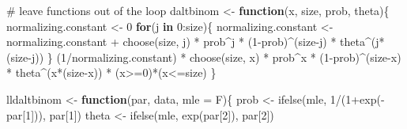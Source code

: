 \documentclass[
]{article}
\newenvironment{Shaded}{\begin{snugshade}}{\end{snugshade}}
\newcommand{\AttributeTok}[1]{\textcolor[rgb]{0.40,0.45,0.13}{#1}}
\newcommand{\CommentTok}[1]{\textcolor[rgb]{0.37,0.37,0.37}{#1}}
\newcommand{\ControlFlowTok}[1]{\textcolor[rgb]{0.00,0.23,0.31}{\textbf{#1}}}
\newcommand{\DecValTok}[1]{\textcolor[rgb]{0.68,0.00,0.00}{#1}}
\newcommand{\FunctionTok}[1]{\textcolor[rgb]{0.28,0.35,0.67}{#1}}
\newcommand{\NormalTok}[1]{\textcolor[rgb]{0.00,0.23,0.31}{#1}}
\newcommand{\OtherTok}[1]{\textcolor[rgb]{0.00,0.23,0.31}{#1}}
\newcommand{\SpecialCharTok}[1]{\textcolor[rgb]{0.37,0.37,0.37}{#1}}
\begin{document}
\begin{Shaded}
\begin{Highlighting}[numbers=left,,]
\CommentTok{\# leave functions out of the loop}
\NormalTok{daltbinom }\OtherTok{\textless{}{-}} \ControlFlowTok{function}\NormalTok{(x, size, prob, theta)\{}
\NormalTok{  normalizing.constant }\OtherTok{\textless{}{-}} \DecValTok{0}
  \ControlFlowTok{for}\NormalTok{(j }\ControlFlowTok{in} \DecValTok{0}\SpecialCharTok{:}\NormalTok{size)\{}
\NormalTok{    normalizing.constant }\OtherTok{\textless{}{-}}\NormalTok{ normalizing.constant }\SpecialCharTok{+} 
      \FunctionTok{choose}\NormalTok{(size, j) }\SpecialCharTok{*}\NormalTok{ prob}\SpecialCharTok{\^{}}\NormalTok{j }\SpecialCharTok{*}\NormalTok{ (}\DecValTok{1}\SpecialCharTok{{-}}\NormalTok{prob)}\SpecialCharTok{\^{}}\NormalTok{(size}\SpecialCharTok{{-}}\NormalTok{j) }\SpecialCharTok{*}\NormalTok{ theta}\SpecialCharTok{\^{}}\NormalTok{(j}\SpecialCharTok{*}\NormalTok{(size}\SpecialCharTok{{-}}\NormalTok{j))}
\NormalTok{  \}}
\NormalTok{  (}\DecValTok{1}\SpecialCharTok{/}\NormalTok{normalizing.constant) }\SpecialCharTok{*}
    \FunctionTok{choose}\NormalTok{(size, x) }\SpecialCharTok{*}\NormalTok{ prob}\SpecialCharTok{\^{}}\NormalTok{x }\SpecialCharTok{*}\NormalTok{ (}\DecValTok{1}\SpecialCharTok{{-}}\NormalTok{prob)}\SpecialCharTok{\^{}}\NormalTok{(size}\SpecialCharTok{{-}}\NormalTok{x) }\SpecialCharTok{*}\NormalTok{ theta}\SpecialCharTok{\^{}}\NormalTok{(x}\SpecialCharTok{*}\NormalTok{(size}\SpecialCharTok{{-}}\NormalTok{x)) }\SpecialCharTok{*}
\NormalTok{      (x}\SpecialCharTok{\textgreater{}=}\DecValTok{0}\NormalTok{)}\SpecialCharTok{*}\NormalTok{(x}\SpecialCharTok{\textless{}=}\NormalTok{size)}
\NormalTok{\}}

\NormalTok{lldaltbinom }\OtherTok{\textless{}{-}} \ControlFlowTok{function}\NormalTok{(par, data, }\AttributeTok{mle =}\NormalTok{ F)\{}
\NormalTok{  prob  }\OtherTok{\textless{}{-}} \FunctionTok{ifelse}\NormalTok{(mle, }\DecValTok{1}\SpecialCharTok{/}\NormalTok{(}\DecValTok{1}\SpecialCharTok{+}\FunctionTok{exp}\NormalTok{(}\SpecialCharTok{{-}}\NormalTok{par[}\DecValTok{1}\NormalTok{])), par[}\DecValTok{1}\NormalTok{])}
\NormalTok{  theta }\OtherTok{\textless{}{-}} \FunctionTok{ifelse}\NormalTok{(mle, }\FunctionTok{exp}\NormalTok{(par[}\DecValTok{2}\NormalTok{]), par[}\DecValTok{2}\NormalTok{])}
  

\end{Highlighting}
\end{Shaded}
\end{document}
